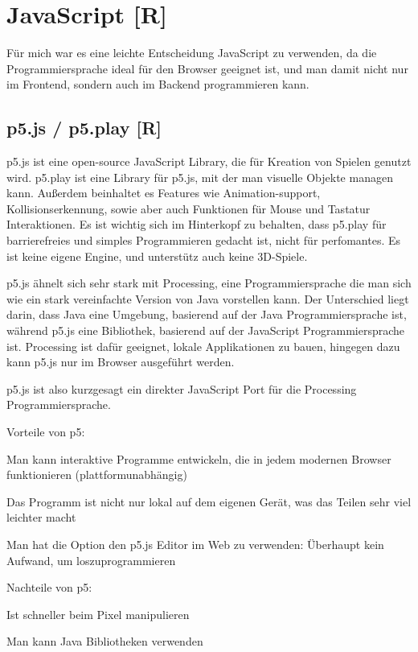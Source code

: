 
\section{JavaScript [R]}
Für mich war es eine leichte Entscheidung JavaScript zu verwenden, da die Programmiersprache ideal für den Browser geeignet ist, und man damit nicht nur im Frontend, sondern auch im Backend programmieren kann.
\subsection{p5.js / p5.play [R]}
p5.js ist eine open-source JavaScript Library, die für Kreation von Spielen genutzt wird. 
p5.play ist eine Library für p5.js, mit der man visuelle Objekte managen kann. Außerdem beinhaltet es Features wie Animation-support, 
Kollisionserkennung, sowie aber auch Funktionen für Mouse und Tastatur Interaktionen.
Es ist wichtig sich im Hinterkopf zu behalten, dass p5.play für barrierefreies und simples Programmieren gedacht ist, nicht für perfomantes.
Es ist keine eigene Engine, und unterstütz auch keine 3D-Spiele.

p5.js ähnelt sich sehr stark mit Processing, eine Programmiersprache die man sich wie ein stark vereinfachte Version von Java vorstellen kann.
Der Unterschied liegt darin, dass Java eine Umgebung, basierend auf der Java Programmiersprache ist, während p5.js eine Bibliothek, basierend auf der JavaScript Programmiersprache ist.
Processing ist dafür geeignet, lokale Applikationen zu bauen, hingegen dazu kann p5.js nur im Browser ausgeführt werden.

p5.js ist also kurzgesagt ein direkter JavaScript Port für die Processing Programmiersprache. 

Vorteile von p5:
\begin{compactitem}
    \item Man kann interaktive Programme entwickeln, die in jedem modernen Browser funktionieren (plattformunabhängig)
    \item Das Programm ist nicht nur lokal auf dem eigenen Gerät, was das Teilen sehr viel leichter macht
    \item Man hat die Option den p5.js Editor im Web zu verwenden: Überhaupt kein Aufwand, um loszuprogrammieren
\end{compactitem}

Nachteile von p5:
\begin{compactitem}
    \item Ist schneller beim Pixel manipulieren
    \item Man kann Java Bibliotheken verwenden
\end{compactitem}

